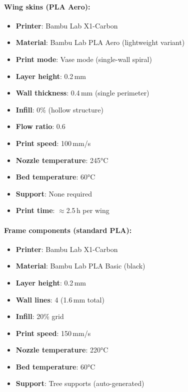 \paragraph{Wing skins (PLA Aero):}
\begin{itemize}
\item \textbf{Printer}: Bambu Lab X1-Carbon
\item \textbf{Material}: Bambu Lab PLA Aero (lightweight variant)
\item \textbf{Print mode}: Vase mode (single-wall spiral)
\item \textbf{Layer height}: 0.2\,mm
\item \textbf{Wall thickness}: 0.4\,mm (single perimeter)
\item \textbf{Infill}: 0\% (hollow structure)
\item \textbf{Flow ratio}: 0.6 
\item \textbf{Print speed}: 100\,mm/s
\item \textbf{Nozzle temperature}: 245°C
\item \textbf{Bed temperature}: 60°C
\item \textbf{Support}: None required
\item \textbf{Print time}: $\approx$2.5\,h per wing
\end{itemize}

\paragraph{Frame components (standard PLA):}
\begin{itemize}
\item \textbf{Printer}: Bambu Lab X1-Carbon
\item \textbf{Material}: Bambu Lab PLA Basic (black)
\item \textbf{Layer height}: 0.2\,mm
\item \textbf{Wall lines}: 4 (1.6\,mm total)
\item \textbf{Infill}: 20\% grid
\item \textbf{Print speed}: 150\,mm/s
\item \textbf{Nozzle temperature}: 220°C
\item \textbf{Bed temperature}: 60°C
\item \textbf{Support}: Tree supports (auto-generated)
\end{itemize}